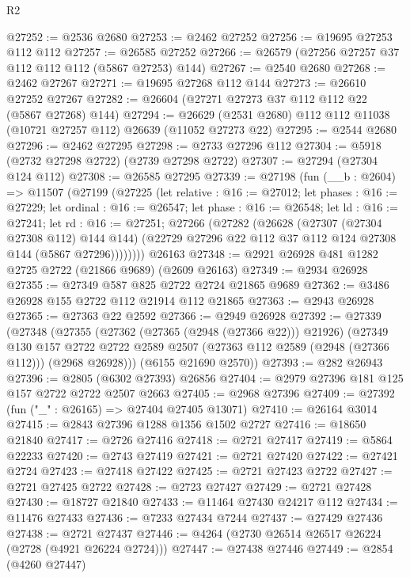 \begin{lexlean}{R2}
\begin{coremodule}
@27252 := @2536 @2680
@27253 := @2462 @27252
@27256 := @19695 @27253 @112 @112
@27257 := @26585 @27252
@27266 := @26579 (@27256 @27257 @37 @112 @112 @112 (@5867 @27253) @144)
@27267 := @2540 @2680
@27268 := @2462 @27267
@27271 := @19695 @27268 @112 @144
@27273 := @26610 @27252 @27267
@27282 := @26604 (@27271 @27273 @37 @112 @112 @22 (@5867 @27268) @144)
@27294 := @26629 (@2531 @2680) @112 @112 @11038 (@10721 @27257 @112) @26639 (@11052 @27273 @22)
@27295 := @2544 @2680
@27296 := @2462 @27295
@27298 := @2733 @27296 @112
@27304 := @5918 (@2732 @27298 @2722) (@2739 @27298 @2722)
@27307 := @27294 (@27304 @124 @112)
@27308 := @26585 @27295
@27339 := @27198
    (fun (__b : @2604) =>
    @11507
      (@27199
        (@27225
          (let relative : @16 := @27012;
          let phases : @16 := @27229;
          let ordinal : @16 := @26547;
          let phase : @16 := @26548;
          let ld : @16 := @27241;
          let rd : @16 := @27251;
          @27266
            (@27282
              (@26628
                (@27307 (@27304 @27308 @112) @144 @144)
                (@22729 @27296 @22 @112 @37 @112 @124 @27308 @144 (@5867 @27296))))))))
    @26163
@27348 := @2921 @26928 @481 @1282 @2725 @2722 (@21866 @9689) (@2609 @26163)
@27349 := @2934 @26928
@27355 := @27349 @587 @825 @2722 @2724 @21865 @9689
@27362 := @3486 @26928 @155 @2722 @112 @21914 @112 @21865
@27363 := @2943 @26928
@27365 := @27363 @22 @2592
@27366 := @2949 @26928
@27392 := @27339
    (@27348
      (@27355
        (@27362 (@27365 (@2948 (@27366 @22))) @21926)
        (@27349
          @130
          @157
          @2722
          @2722
          @2589
          @2507
          (@27363 @112 @2589 (@2948 (@27366 @112)))
          (@2968 @26928)))
      (@6155 @21690 @2570))
@27393 := @282 @26943
@27396 := @2805 (@6302 @27393) @26856
@27404 := @2979 @27396 @181 @125 @157 @2722 @2722 @2507 @2663
@27405 := @2968 @27396
@27409 := @27392 (fun ("_" : @26165) => @27404 @27405 @13071)
@27410 := @26164 @3014
@27415 := @2843 @27396 @1288 @1356 @1502 @2727
@27416 := @18650 @21840
@27417 := @2726 @27416
@27418 := @2721 @27417
@27419 := @5864 @22233
@27420 := @2743 @27419
@27421 := @2721 @27420
@27422 := @27421 @2724
@27423 := @27418 @27422
@27425 := @2721 @27423 @2722
@27427 := @2721 @27425 @2722
@27428 := @2723 @27427
@27429 := @2721 @27428
@27430 := @18727 @21840
@27433 := @11464 @27430 @24217 @112
@27434 := @11476 @27433
@27436 := @7233 @27434 @7244
@27437 := @27429 @27436
@27438 := @2721 @27437
@27446 := @4264 (@2730 @26514 @26517 @26224 (@2728 (@4921 @26224 @2724)))
@27447 := @27438 @27446
@27449 := @2854 (@4260 @27447)

\end{coremodule}
\end{lexlean}
